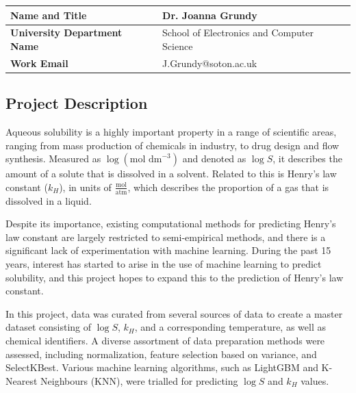 \documentclass[11pt, titlepage]{article}
\begin{document}
\begin{table}[H]
	\centering
	\begin{tabular}{|p{2in}|p{4in}|}
		\hline
		\textbf{Name and Title} & Dr. Joanna Grundy \\ %
		\hline
		\textbf{University Department Name} & 
		School of Electronics and Computer Science \\ %
		\hline
		\textbf{Work Email} & J.Grundy@soton.ac.uk \\ %
		\hline
	\end{tabular}
\end{table}

\subsection{Project Description}
\label{subsec:ProjectDescription}
Aqueous solubility is a highly important property in a range of scientific areas, ranging from mass production of chemicals in industry, to drug design\cite{DrugSolubility} and flow synthesis\cite{FlowChemistry}. Measured as $\log (\text{mol dm}^{-3})$ and denoted as $\log S$, it describes the amount of a solute that is dissolved in a solvent. Related to this is Henry's law constant ($k_H$), in units of $\frac{\text{mol}}{\text{atm}}$, which describes the proportion of a gas that is dissolved in a liquid\cite{Sander}.

Despite its importance, existing computational methods for predicting Henry's law constant are largely restricted to semi-empirical methods, and there is a significant lack of experimentation with machine learning. During the past 15 years, interest has started to arise in the use of machine learning to predict solubility\cite{Llompart2024}, and this project hopes to expand this to the prediction of Henry's law constant.

In this project, data was curated from several sources of data to create a master dataset consisting of $\log S$, $k_H$, and a corresponding temperature, as well as chemical identifiers. A diverse assortment of data preparation methods were assessed, including normalization, feature selection based on variance, and SelectKBest. Various machine learning algorithms, such as LightGBM and K-Nearest Neighbours (KNN), were trialled for predicting {$\log S$} and {$k_H$} values.
\end{document}

